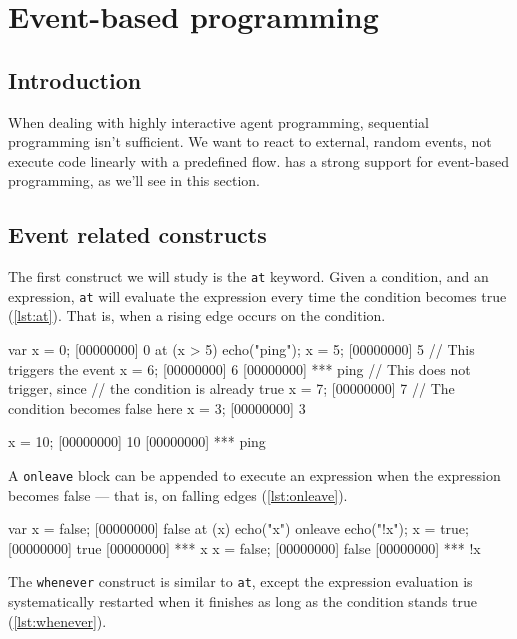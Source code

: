 \documentclass[openright,twoside,12pt]{report}
\begin{document}

\chapter{Event-based programming}

\section{Introduction}

When dealing with highly interactive agent programming, sequential
programming isn't sufficient. We want to react to external, random
events, not execute code linearly with a predefined flow. \urbi has a
strong support for event-based programming, as we'll see in this
section.

\section{Event related constructs}

The first construct we will study is the \lstinline|at| keyword. Given
a condition, and an expression, \lstinline|at| will evaluate the
expression every time the condition becomes true (\autoref{lst:at}). That is,
when a rising edge occurs on the condition.

\begin{urbiscript}[caption=Using \texttt{at}, label=lst:at]
var x = 0;
[00000000] 0
at (x > 5)
  echo("ping");
x = 5;
[00000000] 5
// This triggers the event
x = 6;
[00000000] 6
[00000000] *** ping
// This does not trigger, since
// the condition is already true
x = 7;
[00000000] 7
// The condition becomes false here
x = 3;
[00000000] 3

x = 10;
[00000000] 10
[00000000] *** ping
\end{urbiscript}

A \lstinline|onleave| block can be appended to execute an expression
when the expression becomes false --- that is, on falling edges (\autoref{lst:onleave}).

\begin{urbiscript}[caption=Using \texttt{at ... onleave},
label=lst:onleave]
var x = false;
[00000000] false
at (x)
  echo("x")
onleave
  echo("!x");
x = true;
[00000000] true
[00000000] *** x
x = false;
[00000000] false
[00000000] *** !x
\end{urbiscript}

The \lstinline|whenever| construct is similar to \lstinline|at|,
except the expression evaluation is systematically restarted when it
finishes as long as the condition stands true (\autoref{lst:whenever}).
\end{document}
